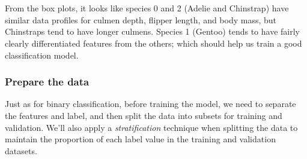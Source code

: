 \documentclass[11pt]{article}
\begin{document}
    \begin{center}
    \end{center}
    { \hspace*{\fill} \\}
    
    \begin{center}
    \end{center}
    { \hspace*{\fill} \\}
    
    From the box plots, it looks like species 0 and 2 (Adelie and Chinstrap)
have similar data profiles for culmen depth, flipper length, and body
mass, but Chinstraps tend to have longer culmens. Species 1 (Gentoo)
tends to have fairly clearly differentiated features from the others;
which should help us train a good classification model.

\hypertarget{prepare-the-data}{%
\subsubsection{Prepare the data}\label{prepare-the-data}}

Just as for binary classification, before training the model, we need to
separate the features and label, and then split the data into subsets
for training and validation. We'll also apply a \emph{stratification}
technique when splitting the data to maintain the proportion of each
label value in the training and validation datasets.
\end{document}
